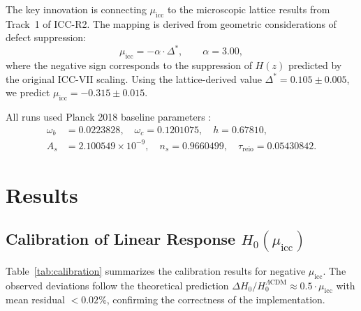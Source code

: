 \documentclass[11pt,a4paper]{article}
\newcommand{\lcdm}{\Lambda\mathrm{CDM}}
\newcommand{\DeltaStar}{\Delta^{\ast}}
\newcommand{\muicc}{\mu_{\mathrm{icc}}}
\begin{document}
The key innovation is connecting $\muicc$ to the microscopic lattice results from Track~1 of ICC-R2. The mapping is derived from geometric considerations of defect suppression:
\begin{equation}
\muicc = -\alpha \cdot \DeltaStar, \qquad \alpha = 3.00,
\end{equation}
where the negative sign corresponds to the suppression of $H(z)$ predicted by the original ICC-VII scaling. Using the lattice-derived value $\DeltaStar = 0.105 \pm 0.005$, we predict $\muicc = -0.315 \pm 0.015$.

All runs used Planck 2018 baseline parameters \cite{planck2018}:
\begin{equation}
\begin{aligned}
\omega_b &= 0.0223828, \quad \omega_c = 0.1201075, \quad h = 0.67810, \\
A_s &= 2.100549 \times 10^{-9}, \quad n_s = 0.9660499, \quad \tau_{\text{reio}} = 0.05430842.
\end{aligned}
\end{equation}

\section{Results}
\label{sec:results}

\subsection{Calibration of Linear Response $H_0(\muicc)$}
\label{subsec:h0_calibration}

Table~\ref{tab:calibration} summarizes the calibration results for negative $\muicc$. The observed deviations follow the theoretical prediction $\Delta H_0 / H_0^{\lcdm} \approx 0.5 \cdot \muicc$ with mean residual $< 0.02\%$, confirming the correctness of the implementation.
\end{document}
